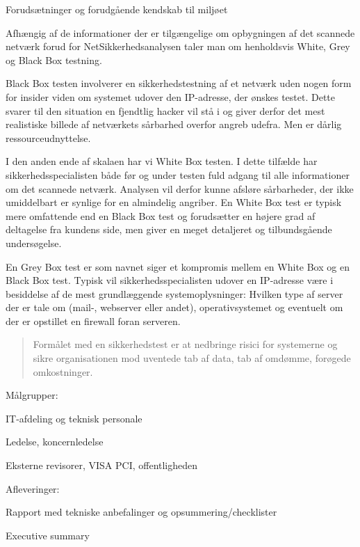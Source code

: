 \documentclass[20pt,landscape,a4paper,footrule]{foils}
\begin{document}
\begin{list1}
\item Forudsætninger og forudgående kendskab til miljøet
\item
Afhængig af de informationer der er tilgængelige om opbygningen af det
scannede netværk forud for NetSikkerhedsanalysen taler man om
henholdsvis White, Grey og Black Box testning.
\begin{list2}
\item Black Box testen involverer en sikkerhedstestning af et netværk uden
nogen form for insider viden om systemet udover den IP-adresse, der
ønskes testet. Dette svarer til den situation en fjendtlig hacker vil
stå i og giver derfor det mest realistiske billede af netværkets
sårbarhed overfor angreb udefra. Men er dårlig ressourceudnyttelse.

\item I den anden ende  af skalaen har vi White Box testen. I dette tilfælde
har sikkerhedsspecialisten både før og under testen fuld adgang til
alle informationer om det scannede netværk. Analysen vil derfor kunne
afsløre sårbarheder, der ikke umiddelbart er synlige for en almindelig
angriber. En White Box test er typisk mere omfattende end en Black Box
test og forudsætter en højere grad af deltagelse fra kundens side, men
giver en meget detaljeret og tilbundsgående undersøgelse.

\item En Grey Box test er som navnet siger et kompromis mellem en White Box
og en Black Box test. Typisk vil sikkerhedsspecialisten udover en
IP-adresse være i besiddelse af de mest grundlæggende
systemoplysninger: Hvilken type af server der er tale om (mail-,
webserver eller andet), operativsystemet og eventuelt om der er
opstillet en firewall foran serveren.
\end{list2}
\end{list1}



\begin{quote}
Formålet med en sikkerhedstest er at nedbringe risici for systemerne
og sikre organisationen mod uventede tab af data, tab af omdømme,
forøgede omkostninger.

\end{quote}

\begin{list1}
\item Målgrupper:
\begin{list2}
\item IT-afdeling og teknisk personale
\item Ledelse, koncernledelse
\item Eksterne revisorer, VISA PCI, offentligheden
\end{list2}
\item Afleveringer:
\begin{list2}
\item Rapport med tekniske anbefalinger og opsummering/checklister
\item Executive summary
\end{list2}
\end{list1}
\end{document}
